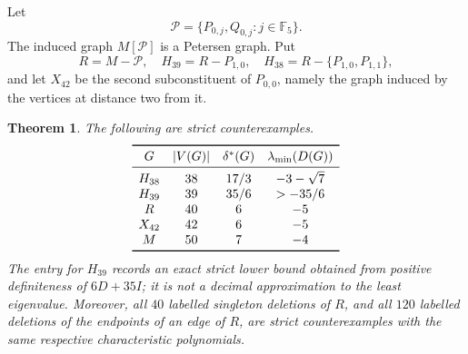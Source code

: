 \documentclass[a4paper,10pt,reqno]{amsart}
\theoremstyle{plain}
\newtheorem{theorem}{Theorem}[section]
\theoremstyle{definition}
\theoremstyle{remark}
\newcommand{\F}{\mathbb F_5}
\begin{document}
Let
\[
 \mathcal P=\{P_{0,j},Q_{0,j}:j\in\F\}.
\]
The induced graph \(M[\mathcal P]\) is a Petersen graph.  Put
\[
 R=M-\mathcal P,
 \quad H_{39}=R-P_{1,0},
 \quad H_{38}=R-\{P_{1,0},P_{1,1}\},
\]
and let \(X_{42}\) be the second subconstituent of \(P_{0,0}\), namely the
graph induced by the vertices at distance two from it.

\begin{theorem}\label{thm:explicit-examples}
The following are strict counterexamples.
\[
\begin{array}{c@{\quad}c@{\quad}c@{\quad}c}
\toprule
G&|V(G)|&\delta^*(G)&\lambda_{\min}(D(G))\\
\midrule
H_{38}&38&17/3&-3-\sqrt7\\
H_{39}&39&35/6&>-35/6\\
R&40&6&-5\\
X_{42}&42&6&-5\\
M&50&7&-4\\
\bottomrule
\end{array}
\]
The entry for \(H_{39}\) records an exact strict lower bound obtained from
positive definiteness of \(6D+35I\); it is not a decimal approximation to the
least eigenvalue.  Moreover, all \(40\) labelled singleton deletions of \(R\),
and all \(120\)
labelled deletions of the endpoints of an edge of \(R\), are strict
counterexamples with the same respective characteristic polynomials.
\end{theorem}
\end{document}
